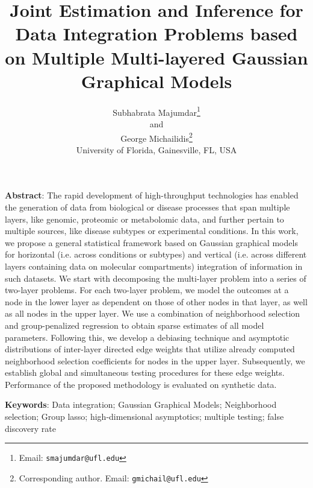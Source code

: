 \documentclass[11pt,letterpaper]{article}
\numberwithin{equation}{section}
\begin{document}
\newtheorem{Theorem}{Theorem}[section]
\newtheorem{Lemma}[Theorem]{Lemma}
\newtheorem{Corollary}[Theorem]{Corollary}
\newtheorem{Proposition}[Theorem]{Proposition}
\newtheorem{Conjecture}[Theorem]{Conjecture}
\theoremstyle{definition} \newtheorem{Definition}[Theorem]{Definition}
\newtheorem{Example}{Example}[section]
\newtheorem{Algorithm}{Algorithm}
\newtheorem{Remark}{Remark}

\title{Joint Estimation and Inference for Data Integration Problems based on Multiple Multi-layered Gaussian Graphical Models}
\date{}
\author{
	Subhabrata Majumdar\thanks{Email: {\tt smajumdar@ufl.edu}}\\
	and\\
	George Michailidis\thanks{Corresponding author. Email: {\tt gmichail@ufl.edu}}\\
	University of Florida, Gainesville, FL, USA
}
\maketitle

\noindent\textbf{Abstract}: 
The rapid development of high-throughput technologies has enabled the generation of data from biological or disease processes that span multiple layers, like genomic, proteomic or metabolomic data, and further pertain to multiple sources, like disease subtypes or experimental conditions. In this work, we propose a general statistical framework based on Gaussian graphical models for horizontal (i.e. across conditions or subtypes) and vertical (i.e. across different layers containing data on molecular compartments) integration of information in such datasets. We start with decomposing the multi-layer problem into a series of two-layer problems. For each two-layer problem, we model the outcomes at a node in the lower layer as dependent on those of other nodes in that layer, as well as all nodes in the upper layer. We use a combination of neighborhood selection and group-penalized regression to obtain sparse estimates of all model parameters. Following this, we develop a debiasing technique and asymptotic distributions of inter-layer directed edge weights that utilize already computed neighborhood selection coefficients for nodes in the upper layer. Subsequently, we establish global and simultaneous testing procedures for these edge weights. Performance of the proposed methodology is evaluated on synthetic data.

\vspace{.5cm}
\noindent\textbf{Keywords}: Data integration; Gaussian Graphical Models; Neighborhood selection; Group lasso; high-dimensional asymptotics; multiple testing; false discovery rate
\end{document}
